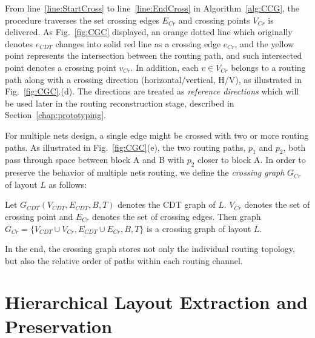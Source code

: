     From line~\ref{line:StartCross} to line~\ref{line:EndCross} in Algorithm~\ref{alg:CCG}, the procedure traverses the set crossing edges $E_{Cr}$ and crossing points $V_{Cr}$ is delivered. As Fig.~\ref{fig:CGC} displayed, an orange dotted line which originally denotes $e_{CDT}$ changes into solid red line as a crossing edge $e_{Cr}$, and the yellow point represents the intersection between the routing path, and such intersected point denotes a crossing point $v_{Cr}$. In addition, each $v \in V_{Cr}$ belongs to a routing path along with a crossing direction (horizontal/vertical, H/V), as illustrated in Fig.~\ref{fig:CGC}.(d). The directions are treated as {\it reference directions} which will be used later in the routing reconstruction stage, described in Section~\ref{chap:prototyping}. 



    For multiple nets design, a single edge might be crossed with two or more routing paths. As illustrated in Fig.~\ref{fig:CGC}(e), the two routing paths, $p_1$ and $p_2$, both pass through space between block A and B with $p_2$ closer to block A. In order to preserve the behavior of multiple nets routing, we define the {\it crossing graph} $G_{Cr}$ of layout $L$ as follows:
    \vspace{0.2cm}
    \begin{defi}\label{defi:CrossGraph}
      Let $G_{CDT}(V_{CDT},E_{CDT},B,T)$ denotes the CDT graph of $L$. $V_{Cr}$ denotes the set of crossing point and $E_{Cr}$ denotes the set of crossing edges. Then graph $G_{Cr} = \{V_{CDT} \cup V_{Cr},E_{CDT} \cup E_{Cr},B,T\}$ is a crossing graph of layout $L$. 
    \end{defi}
    \vspace{0.2cm}
    In the end, the crossing graph stores not only the individual routing topology, but also the relative order of paths within each routing channel.


  \section{Hierarchical Layout Extraction and Preservation}\label{sec:HLE}

